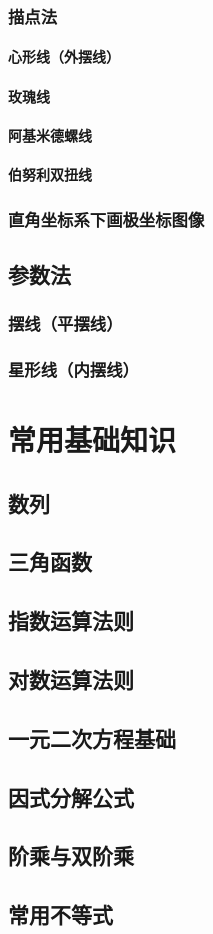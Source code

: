 \documentclass[UTF8, 12pt]{ctexart}
\begin{document}
\subsubsection{描点法}
\paragraph{心形线（外摆线）}
\paragraph{玫瑰线}
\paragraph{阿基米德螺线}
\paragraph{伯努利双扭线}
\subsubsection{直角坐标系下画极坐标图像}
\subsection{参数法}
\subsubsection{摆线（平摆线）}
\subsubsection{星形线（内摆线）}
\section{常用基础知识}
\subsection{数列}
\subsection{三角函数}
\subsection{指数运算法则}
\subsection{对数运算法则}
\subsection{一元二次方程基础}
\subsection{因式分解公式}
\subsection{阶乘与双阶乘}
\subsection{常用不等式}
\end{document}
